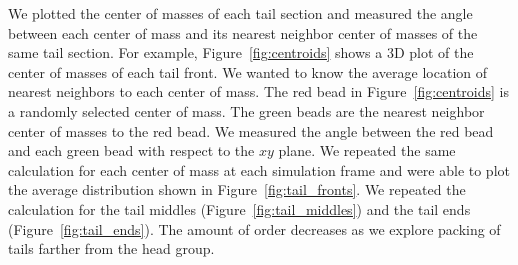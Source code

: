 \documentclass{article}
\begin{document}
  We plotted the center of masses of each tail section and measured the angle 
  between each center of mass and its nearest neighbor center of masses of the
  same tail section. For example, Figure~\ref{fig:centroids} shows a 3D plot of
  the center of masses of each tail front. We wanted to know the average location
  of nearest neighbors to each center of mass. The red bead in 
  Figure~\ref{fig:centroids} is a randomly selected center of mass. The
  green beads are the nearest neighbor center of masses to the red bead. We
  measured the angle between the red bead and each green bead with respect to
  the $xy$ plane. We repeated the same calculation for each center of mass at
  each simulation frame and were able to plot the average distribution shown
  in Figure~\ref{fig:tail_fronts}. We repeated the calculation for the tail
  middles (Figure~\ref{fig:tail_middles}) and the tail ends 
  (Figure~\ref{fig:tail_ends}). The amount of order decreases as we explore
  packing of tails farther from the head group.
\end{document}
